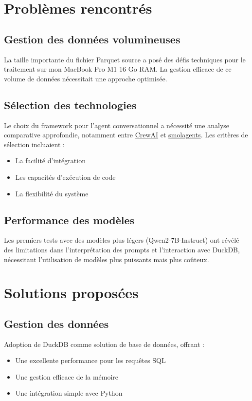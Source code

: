 \documentclass[12pt]{article}
\begin{document}
\section{Problèmes rencontrés}

\subsection{Gestion des données volumineuses}
La taille importante du fichier Parquet source a posé des défis techniques pour le traitement sur mon MacBook Pro M1 16 Go RAM. 
La gestion efficace de ce volume de données nécessitait une approche optimisée.

\subsection{Sélection des technologies}
Le choix du framework pour l'agent conversationnel a nécessité une analyse comparative approfondie, notamment 
entre \href{https://github.com/crewAIInc/crewAI}{CrewAI} et \href{https://github.com/huggingface/smolagents}{smolagents}. 
Les critères de sélection incluaient :
\begin{itemize}
    \item La facilité d'intégration
    \item Les capacités d'exécution de code
    \item La flexibilité du système
\end{itemize}

\subsection{Performance des modèles}
Les premiers tests avec des modèles plus légers (Qwen2-7B-Instruct) ont révélé des limitations dans l'interprétation des prompts et l'interaction avec DuckDB, nécessitant l'utilisation de modèles plus puissants mais plus coûteux.

\section{Solutions proposées}

\subsection{Gestion des données}
Adoption de DuckDB comme solution de base de données, offrant :
\begin{itemize}
    \item Une excellente performance pour les requêtes SQL
    \item Une gestion efficace de la mémoire
    \item Une intégration simple avec Python
\end{itemize}
\end{document}
